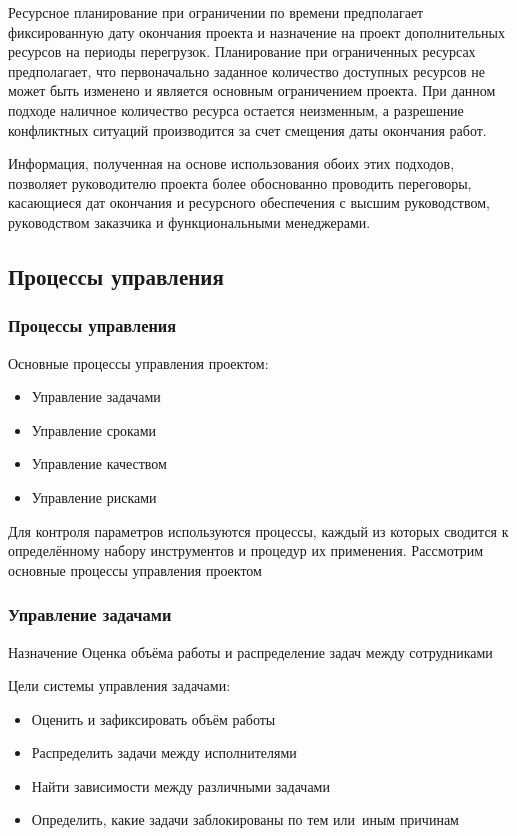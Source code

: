 \documentclass{../industrial-development}
\begin{document}
Ресурсное планирование при ограничении по времени предполагает фиксированную дату окончания проекта и назначение на проект дополнительных ресурсов на периоды перегрузок. Планирование при ограниченных ресурсах предполагает, что первоначально заданное количество доступных ресурсов не может быть изменено и является основным ограничением проекта. При данном подходе наличное количество ресурса остается неизменным, а разрешение конфликтных ситуаций производится за счет смещения даты окончания работ.

Информация, полученная на основе использования обоих этих подходов, позволяет руководителю проекта более обоснованно проводить переговоры, касающиеся дат окончания и ресурсного обеспечения с высшим руководством, руководством заказчика и функциональными менеджерами.

    \subsection{Процессы управления}

\begin{frame} \frametitle{Процессы управления}
	Основные процессы управления проектом:
	\begin{itemize}
		\item Управление задачами
		\item Управление сроками
		\item Управление качеством
		\item Управление рисками
	\end{itemize}
\end{frame}
\lecturenotes

Для контроля параметров используются процессы, каждый из которых сводится к определённому набору инструментов и процедур их применения. Рассмотрим основные процессы управления проектом

\begin{frame} \frametitle{Управление задачами}
	\begin{block}{Назначение}
		Оценка объёма работы и распределение задач между сотрудниками
	\end{block}
	Цели системы управления задачами:
	\begin{itemize}
		\item Оценить и зафиксировать объём работы
		\item Распределить задачи между исполнителями
		\item Найти зависимости между различными задачами
		\item Определить, какие задачи заблокированы по тем или~иным причинам
	\end{itemize}
\end{frame}
\lecturenotes
\end{document}

